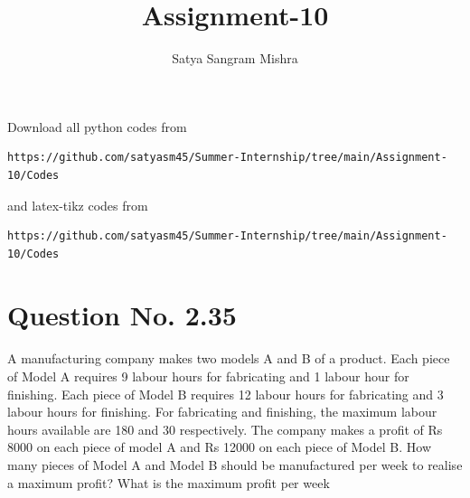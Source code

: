 \documentclass[journal,12pt,twocolumn]{IEEEtran}
\begin{document}
     \def\centbox#1{\makebox[0in]{#1}}
     \def\topbox#1{\raisebox{-\baselineskip}[0in][0in]{#1}}
     \def\midbox#1{\raisebox{-0.5\baselineskip}[0in][0in]{#1}}
\vspace{3cm}
\title{Assignment-10}
\author{Satya Sangram Mishra}
\maketitle
\newpage
\bigskip
\renewcommand{\thefigure}{\theenumi}
\renewcommand{\thetable}{\theenumi}
Download all python codes from 
\begin{lstlisting}
https://github.com/satyasm45/Summer-Internship/tree/main/Assignment-10/Codes
\end{lstlisting}
%
and latex-tikz codes from 
%
\begin{lstlisting}
https://github.com/satyasm45/Summer-Internship/tree/main/Assignment-10/Codes
\end{lstlisting}
%
\section{Question No. 2.35}
A manufacturing
company makes two models A and B of a
product. Each piece of Model A requires
9 labour hours for fabricating and 1 labour
hour for finishing. Each piece of Model B
requires 12 labour hours for fabricating and 3
labour hours for finishing. For fabricating and
finishing, the maximum labour hours available
are 180 and 30 respectively. The company
makes a profit of Rs 8000 on each piece
of model A and Rs 12000 on each piece of
Model B. How many pieces of Model A and
Model B should be manufactured per week
to realise a maximum profit? What is the
maximum profit per week
\end{document}

